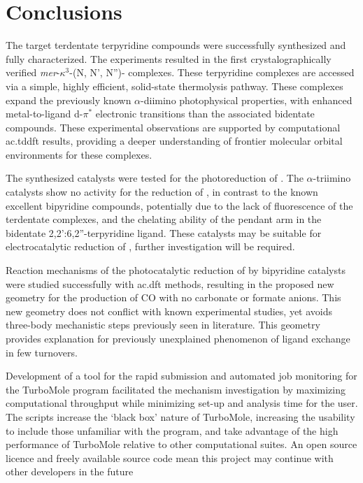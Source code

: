 \chapter{Conclusions}

The target  terdentate terpyridine compounds were successfully synthesized and fully characterized. The experiments resulted in the first crystalographically verified \textit{mer}-$\kappa^3$-(N, N', N'')- complexes. These terpyridine complexes are accessed via a simple, highly efficient, solid-state thermolysis pathway. These complexes expand the previously known $\alpha$-diimino photophysical properties, with enhanced metal-to-ligand d-$\pi^\ast$ electronic transitions than the associated bidentate compounds. These experimental observations are supported by computational \gls{ac.tddft} results, providing  a deeper understanding of frontier molecular orbital environments for these complexes. 

The synthesized catalysts were tested for the photoreduction of . The $\alpha$-triimino catalysts show no activity for the reduction of , in contrast to the known excellent bipyridine compounds, potentially due to the lack of fluorescence of the terdentate complexes, and the chelating ability of the pendant arm in the bidentate 2,2':6,2''-terpyridine ligand. These catalysts may be suitable for electrocatalytic reduction of , further investigation will be required.

Reaction mechanisms of the photocatalytic reduction of  by bipyridine catalysts were studied successfully with \gls{ac.dft} methods, resulting in the proposed new geometry for the production of {CO} with no carbonate or formate anions. This new geometry does not conflict with known experimental studies, yet avoids three-body mechanistic steps previously seen in literature. This geometry provides explanation for previously unexplained phenomenon of  ligand exchange in few turnovers.

Development of a tool for the rapid submission and automated job monitoring for the TurboMole program facilitated the mechanism investigation by maximizing computational throughput while minimizing set-up and analysis time for the user. The scripts increase the `black box' nature of TurboMole, increasing the usability to include those unfamiliar with the program, and take advantage of the high performance of TurboMole relative to other computational suites. An open source licence and freely available source code mean this project may continue with other developers in the future



